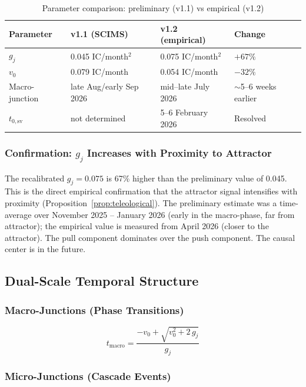\documentclass[12pt,a4paper]{article}
\newcommand{\gj}{g_j}
\begin{document}
\begin{table}[H]
\centering
\caption{Parameter comparison: preliminary (v1.1) vs empirical (v1.2)}
\label{tab:param_compare}
\begin{tabular}{@{}llll@{}}
\toprule
\textbf{Parameter} & \textbf{v1.1 (SCIMS)} & \textbf{v1.2 (empirical)} & \textbf{Change} \\
\midrule
$\gj$ & 0.045 IC/month$^2$ & 0.075 IC/month$^2$ & $+67\%$ \\
$v_0$ & 0.079 IC/month & 0.054 IC/month & $-32\%$ \\
Macro-junction & late Aug/early Sep 2026 & mid--late July 2026 & $\sim$5--6 weeks earlier \\
$t_{0,\mathrm{sv}}$ & not determined & 5--6 February 2026 & Resolved \\
\bottomrule
\end{tabular}
\end{table}

\subsubsection{Confirmation: $\gj$ Increases with Proximity to Attractor}

The recalibrated $\gj = 0.075$ is 67\% higher than the preliminary value of 0.045. This is the direct empirical confirmation that the attractor signal intensifies with proximity (Proposition~\ref{prop:teleological}). The preliminary estimate was a time-average over November 2025 -- January 2026 (early in the macro-phase, far from attractor); the empirical value is measured from April 2026 (closer to the attractor). The pull component dominates over the push component. The causal center is in the future.

\subsection{Dual-Scale Temporal Structure}

\subsubsection{Macro-Junctions (Phase Transitions)}

\begin{equation}\label{eq:macro}
t_{\text{macro}} = \frac{-v_0 + \sqrt{v_0^2 + 2\,\gj}}{\gj}
\end{equation}

\subsubsection{Micro-Junctions (Cascade Events)}
\end{document}
